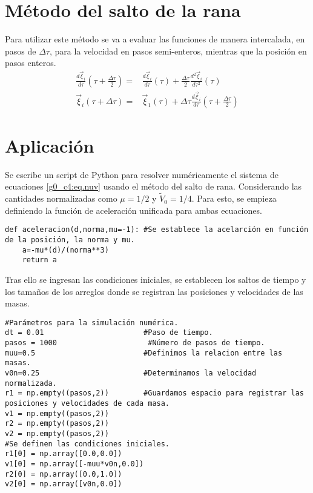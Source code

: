 \documentclass[../portafolio.tex]{subfiles}
\begin{document}
\section{Método del salto de la rana}
Para utilizar este método se va a evaluar las funciones de manera intercalada, en pasos de $\Delta \tau$, para la velocidad en pasos semi-enteros, mientras que la posición en pasos enteros.
\begin{align}
\frac{d\vec{\xi}_i}{d \tau}\left(\tau+\frac{\Delta \tau}{2}\right)=&\frac{d\vec{\xi}_i}{d \tau}(\tau)+\frac{\Delta \tau}{2}\frac{d^2\vec{\xi}_i}{d \tau^2}(\tau)\\
\vec{\xi}_i(\tau+\Delta \tau)=&\vec{\xi}_1(\tau)+\Delta \tau\frac{d\vec{\xi}_i}{d \tau}\left(\tau+\frac{\Delta \tau}{2}\right)
\end{align}

\section{Aplicación}
Se escribe un script de Python para resolver numéricamente el sistema de ecuaciones \eqref{g0_c4:eq.nuv} usando el método del salto de rana. Considerando las cantidades normalizadas como $\mu=1/2$ y $\tilde{V}_0=1/4$. Para esto, se empieza definiendo la función de aceleración unificada para ambas ecuaciones.

\begin{verbatim}
def aceleracion(d,norma,mu=-1):	#Se establece la acelarción en función de la posición, la norma y mu.
    a=-mu*(d)/(norma**3)
    return a
\end{verbatim}
Tras ello se ingresan las condiciones iniciales, se establecen los saltos de tiempo y los tamaños de los arreglos donde se registran las posiciones y velocidades de las masas. 
\begin{verbatim}
#Parámetros para la simulación numérica.
dt = 0.01                       #Paso de tiempo.
pasos = 1000                     #Número de pasos de tiempo.
muu=0.5                         #Definimos la relacion entre las masas.
v0n=0.25                        #Determinamos la velocidad normalizada.
r1 = np.empty((pasos,2))        #Guardamos espacio para registrar las posiciones y velocidades de cada masa.
v1 = np.empty((pasos,2))
r2 = np.empty((pasos,2))
v2 = np.empty((pasos,2))
#Se definen las condiciones iniciales.
r1[0] = np.array([0.0,0.0])
v1[0] = np.array([-muu*v0n,0.0])
r2[0] = np.array([0.0,1.0])
v2[0] = np.array([v0n,0.0])
\end{verbatim}
\end{document}

